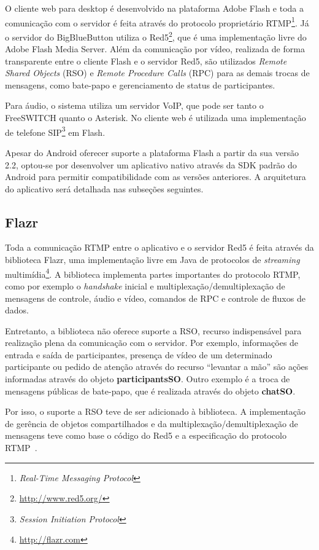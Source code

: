 \documentclass{acm_proc_article-sp}
\begin{document}
O cliente web para desktop é desenvolvido na plataforma Adobe Flash e toda a comunicação com o servidor é feita através do protocolo proprietário RTMP\footnote{\emph{Real-Time Messaging Protocol}}. Já o servidor do BigBlueButton utiliza o Red5\footnote{\url{http://www.red5.org/}}, que é uma implementação livre do Adobe Flash Media Server. Além da comunicação por vídeo, realizada de forma transparente entre o cliente Flash e o servidor Red5, são utilizados \emph{Remote Shared Objects} (RSO) e \emph{Remote Procedure Calls} (RPC) para as demais trocas de mensagens, como bate-papo e gerenciamento de status de participantes.

Para áudio, o sistema utiliza um servidor VoIP, que pode ser tanto o FreeSWITCH quanto o Asterisk. No cliente web é utilizada uma implementação de telefone SIP\footnote{\emph{Session Initiation Protocol}} em Flash.

Apesar do Android oferecer suporte a plataforma Flash a partir da sua versão 2.2, optou-se por desenvolver um aplicativo nativo através da SDK padrão do Android para permitir compatibilidade com as versões anteriores. A arquitetura do aplicativo será detalhada nas subseções seguintes.

\subsection{Flazr}

Toda a comunicação RTMP entre o aplicativo e o servidor Red5 é feita através da biblioteca Flazr, uma implementação livre em Java de protocolos de \emph{streaming} multimídia\footnote{\url{http://flazr.com}}. A biblioteca implementa partes importantes do protocolo RTMP, como por exemplo o \emph{handshake} inicial e multiplexação/demultiplexação de mensagens de controle, áudio e vídeo, comandos de RPC e controle de fluxos de dados.

Entretanto, a biblioteca não oferece suporte a RSO, recurso indispensável para realização plena da comunicação com o servidor. Por exemplo, informações de entrada e saída de participantes, presença de vídeo de um determinado participante ou pedido de atenção através do recurso ``levantar a mão'' são ações informadas através do objeto \textbf{participantsSO}. Outro exemplo é a troca de mensagens públicas de bate-papo, que é realizada através do objeto \textbf{chatSO}. 

Por isso, o suporte a RSO teve de ser adicionado à biblioteca. A implementação de gerência de objetos compartilhados e da multiplexação/demultiplexação de mensagens teve como base o código do Red5 e a especificação do protocolo RTMP~\cite{rtmp}.
\end{document}
